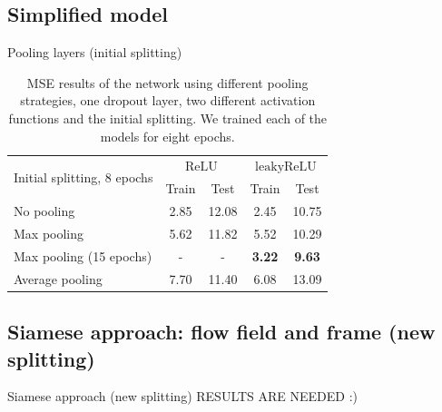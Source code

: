 \subsection{Simplified model}
\begin{frame}{Pooling layers (initial splitting)}
\begin{table}[!t]
\normalsize
\centering
\begin{tabular}{lcccc}
\toprule
\multirow{2}{*}{Initial splitting, 8 epochs}  & \multicolumn{2}{c}{$\mathrm{ReLU}$} & \multicolumn{2}{c}{$\mathrm{leakyReLU}$} \\
 & Train & Test & Train & Test\\
\midrule
No pooling & 2.85 & 12.08 & 2.45 & 10.75 \\
Max pooling & 5.62 & 11.82 & 5.52 & 10.29 \\
Max pooling (15 epochs) & - & - & \textbf{3.22} & \textbf{9.63} \\
Average pooling & 7.70 & 11.40 & 6.08 & 13.09\\
\bottomrule
\end{tabular}
\caption{MSE results of the network using different pooling strategies, one dropout layer, two different activation functions and 
the initial splitting. We trained each of the models for eight epochs.}
\end{table}
\end{frame}
\subsection{Siamese approach: flow field and frame (new splitting)}
\begin{frame}{Siamese approach (new splitting)}
RESULTS ARE NEEDED :)
\end{frame}
